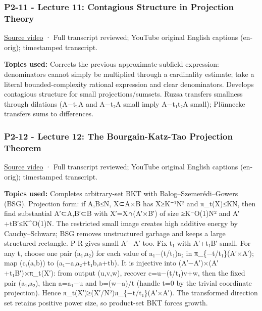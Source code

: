 \subsubsection{P2-11 - Lecture 11: Contagious Structure in Projection Theory}\label{04-visual-computing-ii-ch036-p2-11---lecture-11-contagious-structure-in-projection-theory}

\hypertarget{04-visual-computing-ii-ch036-p2-11---lecture-11-contagious-structure-in-projection-theory}{}

\href{https://www.youtube.com/watch?v=Uz7aJtbfqkU}{Source video} · Full transcript reviewed; YouTube original English captions (en-orig); timestamped transcript.

\textbf{Topics used:} Corrects the previous approximate-subfield expression: denominators cannot simply be multiplied through a cardinality estimate; take a literal bounded-complexity rational expression and clear denominators. Develops contagious structure for small projections/sumsets. Ruzsa transfers smallness through dilations (A−t₁A and A−t₂A small imply A−t₁t₂A small); Plünnecke transfers sums to differences.

\subsubsection{P2-12 - Lecture 12: The Bourgain-Katz-Tao Projection Theorem}\label{04-visual-computing-ii-ch036-p2-12---lecture-12-the-bourgain-katz-tao-projection-theorem}

\hypertarget{04-visual-computing-ii-ch036-p2-12---lecture-12-the-bourgain-katz-tao-projection-theorem}{}

\href{https://www.youtube.com/watch?v=aHQxdnufLbg}{Source video} · Full transcript reviewed; YouTube original English captions (en-orig); timestamped transcript.

\textbf{Topics used:} Completes arbitrary-set BKT with Balog--Szemerédi--Gowers (BSG). Projection form: if \textbar A\textbar,\textbar B\textbar≤N, X⊂A×B has \textbar X\textbar≥K⁻¹N² and \textbar π\_t(X)\textbar≤KN, then find substantial A′⊂A,B′⊂B with X′=X∩(A′×B′) of size ≥K⁻O(1)N² and \textbar A′+tB′\textbar≤K\^{}O(1)N. The restricted small image creates high additive energy by Cauchy--Schwarz; BSG removes unstructured garbage and keeps a large structured rectangle. P-R gives small A′−A′ too. Fix t₁ with A′+t₁B′ small. For any t, choose one pair (a₁,a₂) for each value of a₁−(t/t₁)a₂ in π\_\{−t/t₁\}(A′×A′); map (c,(a,b)) to (a₁−a,a₂+t₁b,a+tb). It is injective into (A′−A′)×(A′+t₁B′)×π\_t(X′): from output (u,v,w), recover c=u−(t/t₁)v+w, then the fixed pair (a₁,a₂), then a=a₁−u and b=(w−a)/t (handle t=0 by the trivial coordinate projection). Hence \textbar π\_t(X′)\textbar≥(\textbar X′\textbar/N²)\textbar π\_\{−t/t₁\}(A′×A′)\textbar. The transformed direction set retains positive power size, so product-set BKT forces growth.

